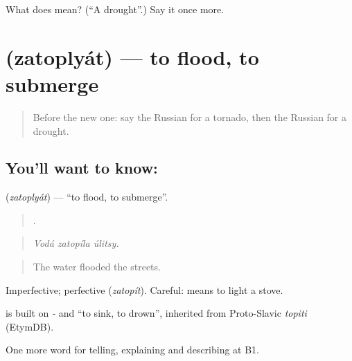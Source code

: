 \begin{tcolorbox}[breakable,colback=teal!4,colframe=teal!35!black,title={Before you move on}]
What does  mean? (\textquotedblleft{}A drought\textquotedblright{}.) Say it once more.
\end{tcolorbox}
\section[\texorpdfstring{\ru{затоплять} (zatoplyát)}{затоплять (zatoplyát)}]{ (zatoplyát) — to flood, to submerge}

\label{lesson:RU-C300-zatoplyat}



\begin{quote}
Before the new one: say the Russian for a tornado, then the Russian for a drought.
\end{quote}

\subsection*{You'll want to know: }
\textbf{} (\emph{zatoplyát}) — \textquotedblleft{}to flood, to submerge\textquotedblright{}.

\begin{quote}
  .
\end{quote}

\begin{quote}
\emph{Vodá zatopíla úlitsy.}
\end{quote}

\begin{quote}
The water flooded the streets.
\end{quote}

Imperfective; perfective \emph{} (\emph{zatopít}). Careful: \emph{ } means to light a stove.

\begin{cousinweb}
\emph{} is built on \emph{-} and \emph{} \textquotedblleft{}to sink, to drown\textquotedblright{}, inherited from Proto-Slavic \emph{topiti} (EtymDB).
\end{cousinweb}

\begin{grammarlens}[title={What you've built}]
One more word for telling, explaining and describing at B1.
\end{grammarlens}


